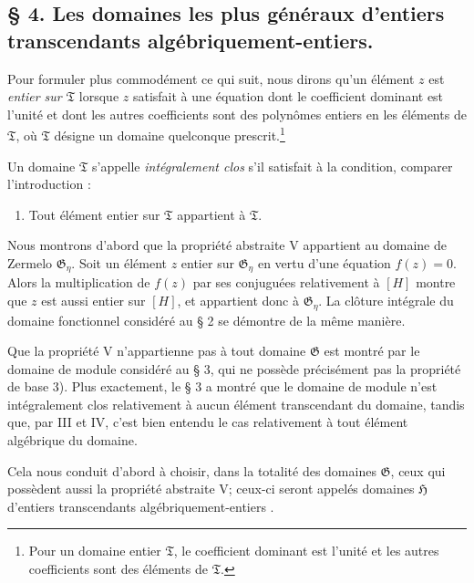 \subsection*{\S{} 4. Les domaines les plus généraux d'entiers transcendants algébriquement-entiers.}

Pour formuler plus commodément ce qui suit, nous dirons qu'un élément $z$ est \emph{entier sur $\mathfrak T$} lorsque $z$ satisfait à une équation dont le coefficient dominant est l'unité et dont les autres coefficients sont des polynômes entiers en les éléments de $\mathfrak T$, où $\mathfrak T$ désigne un domaine quelconque prescrit.\footnote{Pour un domaine entier $\mathfrak T$, le coefficient dominant est l'unité et les autres coefficients sont des éléments de $\mathfrak T$.}

Un domaine $\mathfrak T$ s'appelle \emph{intégralement clos} s'il satisfait à la condition, comparer l'introduction :
\begin{enumerate}
\item[V.] Tout élément entier sur $\mathfrak T$ appartient à $\mathfrak T$.
\end{enumerate}

Nous montrons d'abord que la propriété abstraite V appartient au domaine de Zermelo $\mathfrak G_\eta$. Soit un élément $z$ entier sur $\mathfrak G_\eta$ en vertu d'une équation $f(z)=0$. Alors la multiplication de $f(z)$ par ses conjuguées relativement à $[H]$ montre que $z$ est aussi entier sur $[H]$, et appartient donc à $\mathfrak G_\eta$. La clôture intégrale du domaine fonctionnel considéré au \S{} 2 se démontre de la même manière.

Que la propriété V n'appartienne pas à tout domaine $\mathfrak G$ est montré par le domaine de module considéré au \S{} 3, qui ne possède précisément pas la propriété de base 3). Plus exactement, le \S{} 3 a montré que le domaine de module n'est intégralement clos relativement à aucun élément transcendant du domaine, tandis que, par III et IV, c'est bien entendu le cas relativement à tout élément algébrique du domaine.

Cela nous conduit d'abord à choisir, dans la totalité des domaines $\mathfrak G$, ceux qui possèdent aussi la propriété abstraite V; ceux-ci seront appelés \og{} domaines $\mathfrak H$ d'entiers transcendants algébriquement-entiers \fg{}.

